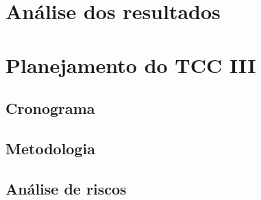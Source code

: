 %

\section{Análise dos resultados}

\section{Planejamento do TCC III}

\subsection{Cronograma}

\subsection{Metodologia}

\subsection{Análise de riscos}
